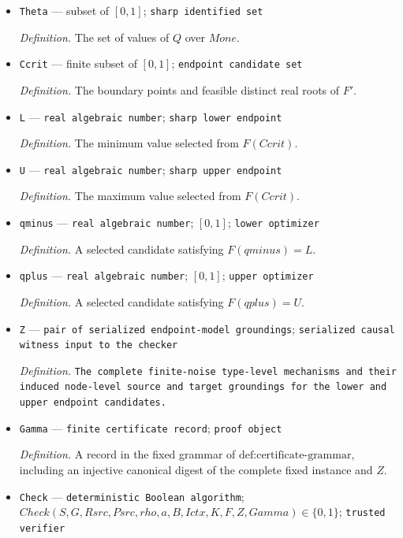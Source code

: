 \documentclass{article}
\begin{document}
\begin{itemize}
  \par\smallskip\noindent\emph{Definition.} \(Q(M)=P_M^{rho}(B\mid\operatorname{do}(a))\).
  \item \texttt{Theta} --- subset of \([0,1]\); \texttt{sharp identified set}
  \par\smallskip\noindent\emph{Definition.} The set of values of \(Q\) over \(Mone\).
  \item \texttt{Ccrit} --- finite subset of \([0,1]\); \texttt{endpoint candidate set}
  \par\smallskip\noindent\emph{Definition.} The boundary points and feasible distinct real roots of \(F'\).
  \item \texttt{L} --- \texttt{real algebraic number}; \texttt{sharp lower endpoint}
  \par\smallskip\noindent\emph{Definition.} The minimum value selected from \(F(Ccrit)\).
  \item \texttt{U} --- \texttt{real algebraic number}; \texttt{sharp upper endpoint}
  \par\smallskip\noindent\emph{Definition.} The maximum value selected from \(F(Ccrit)\).
  \item \texttt{qminus} --- \texttt{real algebraic number}; \([0,1]\); \texttt{lower optimizer}
  \par\smallskip\noindent\emph{Definition.} A selected candidate satisfying \(F(qminus)=L\).
  \item \texttt{qplus} --- \texttt{real algebraic number}; \([0,1]\); \texttt{upper optimizer}
  \par\smallskip\noindent\emph{Definition.} A selected candidate satisfying \(F(qplus)=U\).
  \item \texttt{Z} --- \texttt{pair of serialized endpoint-\allowbreak{}model groundings}; \texttt{serialized causal witness input to the checker}
  \par\smallskip\noindent\emph{Definition.} \texttt{The complete finite-\allowbreak{}noise type-\allowbreak{}level mechanisms and their induced node-\allowbreak{}level source and target groundings for the lower and upper endpoint candidates.}
  \item \texttt{Gamma} --- \texttt{finite certificate record}; \texttt{proof object}
  \par\smallskip\noindent\emph{Definition.} A record in the fixed grammar of \(\text{def:certificate-grammar}\), including an injective canonical digest of the complete fixed instance and \(Z\).
  \item \texttt{Check} --- \texttt{deterministic Boolean algorithm}; \(Check(S,G,Rsrc,Psrc,rho,a,B,Ictx,K,F,Z,Gamma)\in\{0,1\}\); \texttt{trusted verifier}

\end{itemize}
\end{document}
